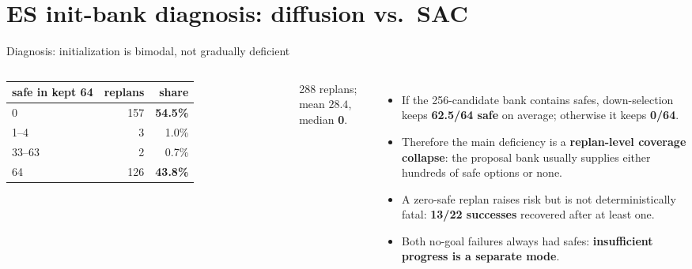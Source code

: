 
\section{ES init-bank diagnosis: diffusion vs.\ SAC}

\begin{frame}{Diagnosis: initialization is bimodal, not gradually deficient}
  \small
  \begin{columns}[T]
    \centering
    \begin{tabular}{@{}lrr@{}}
      \toprule
      safe in kept 64 & replans & share \\
      \midrule
      0     & 157 & \textbf{54.5\%} \\
      1--4  &   3 & 1.0\% \\
      33--63&   2 & 0.7\% \\
      64    & 126 & \textbf{43.8\%} \\
      \bottomrule
    \end{tabular}

    \vspace{0.5em}
    288 replans; mean $28.4$, median \textbf{0}.

    \begin{itemize}
      \item If the 256-candidate bank contains safes, down-selection keeps
            \textbf{62.5/64 safe} on average; otherwise it keeps
            \textbf{0/64}.
      \item Therefore the main deficiency is a \textbf{replan-level coverage
            collapse}: the proposal bank usually supplies either hundreds of
            safe options or none.
      \item A zero-safe replan raises risk but is not deterministically fatal:
            \textbf{13/22 successes} recovered after at least one.
      \item Both no-goal failures always had safes:
            \textbf{insufficient progress is a separate mode}.
    \end{itemize}
  \end{columns}
\end{frame}

